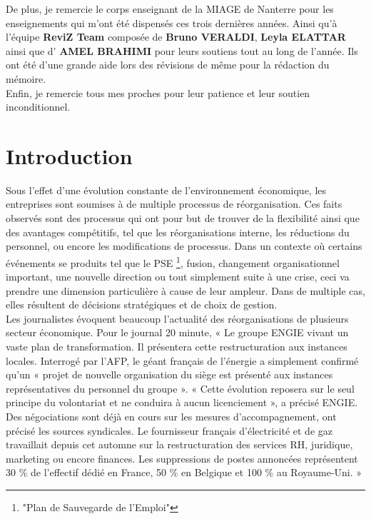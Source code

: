 \documentclass[12pt,a4paper]{article}
\begin{document}
De plus, je remercie le corps enseignant de la MIAGE de Nanterre pour les enseignements qui m'ont été dispensés ces trois dernières années. Ainsi qu'à l'équipe \textbf{ReviZ Team} composée de \textbf{Bruno VERALDI}, \textbf{Leyla ELATTAR} ainsi que d' \textbf{AMEL BRAHIMI} pour leurs soutiens tout au long de l'année. Ils ont été d'une grande aide lors des révisions de même pour la rédaction du mémoire.\\

Enfin, je remercie tous mes proches pour leur patience et leur soutien inconditionnel.


\newpage
\thispagestyle{empty}
\strut

\newpage
\tableofcontents

\newpage
\part{Introduction}

Sous l'effet d'une évolution constante de l'environnement économique, les entreprises sont soumises à de multiple processus de réorganisation. Ces faits observés sont des processus qui ont pour but de trouver de la flexibilité ainsi que des avantages compétitifs, tel que les réorganisations interne, les réductions du personnel, ou encore les modifications de processus. Dans un contexte où certains événements se produits tel que le PSE \footnote{"Plan de Sauvegarde de l’Emploi"}, fusion, changement organisationnel important, une nouvelle direction ou tout simplement suite à une crise, ceci va prendre une dimension particulière à cause de leur ampleur. Dans de multiple cas, elles résultent de décisions stratégiques et de choix de gestion.\\

Les journalistes évoquent beaucoup l'actualité des réorganisations de plusieurs secteur économique. Pour le journal 20 minute, « Le groupe ENGIE vivant un vaste plan de transformation. Il présentera cette restructuration aux instances locales. Interrogé par l’AFP, le géant français de l’énergie a simplement confirmé qu’un « projet de nouvelle organisation du siège est présenté aux instances représentatives du personnel du groupe ».
« Cette évolution reposera sur le seul principe du volontariat et ne conduira à aucun licenciement », a précisé ENGIE. Des négociations sont déjà en cours sur les mesures d’accompagnement, ont précisé les sources syndicales. Le fournisseur français d’électricité et de gaz travaillait depuis cet automne sur la restructuration des services RH, juridique, marketing ou encore finances. Les suppressions de postes annoncées représentent 30 \% de l’effectif dédié en France, 50 \% en Belgique et 100 \% au Royaume-Uni. »\\
\end{document}
